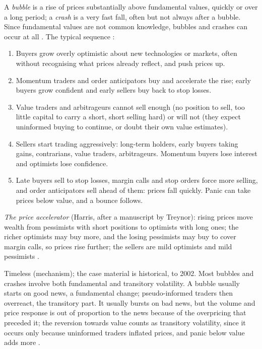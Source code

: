 \begin{qfmechanism}\label{mech:bubble-crash-dynamics}
 A \emph{bubble} is a rise of prices substantially above fundamental values, quickly or over a long period; a \emph{crash} is a very fast fall, often but not always after a bubble. Since fundamental values are not common knowledge, bubbles and crashes can occur at all \citep[chap.~``Bubbles, Crashes, and Circuit Breakers'', sec.~28.1, p.~556]{alpha-harris}. The typical sequence \citep[same chap., sec.~28.1.1, pp.~556--557]{alpha-harris}:
\begin{enumerate}
\item Buyers grow overly optimistic about new technologies or markets, often without recognising what prices already reflect, and push prices up.
\item Momentum traders and order anticipators buy and accelerate the rise; early buyers grow confident and early sellers buy back to stop losses.
\item Value traders and arbitrageurs cannot sell enough (no position to sell, too little capital to carry a short, short selling hard) or will not (they expect uninformed buying to continue, or doubt their own value estimates).
\item Sellers start trading aggressively: long-term holders, early buyers taking gains, contrarians, value traders, arbitrageurs. Momentum buyers lose interest and optimists lose confidence.
\item Late buyers sell to stop losses, margin calls and stop orders force more selling, and order anticipators sell ahead of them: prices fall quickly. Panic can take prices below value, and a bounce follows.
\end{enumerate}
\emph{The price accelerator} (Harris, after a manuscript by Treynor): rising prices move wealth from pessimists with short positions to optimists with long ones; the richer optimists may buy more, and the losing pessimists may buy to cover margin calls, so prices rise further; the sellers are mild optimists and mild pessimists \citep[same chap., box, p.~556]{alpha-harris}.

 Timeless (mechanism); the case material is historical, to 2002. Most bubbles and crashes involve both fundamental and transitory volatility. A bubble usually starts on good news, a fundamental change; pseudo-informed traders then overreact, the transitory part. It usually bursts on bad news, but the volume and price response is out of proportion to the news because of the overpricing that preceded it; the reversion towards value counts as transitory volatility, since it occurs only because uninformed traders inflated prices, and panic below value adds more \citep[same chap., sec.~28.1.2, pp.~557--558]{alpha-harris}.


\end{qfmechanism}
